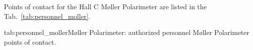 \begin{safetyen}{0}{0}
Points of contact for the Hall C M\o ller Polarimeter are listed in the Tab.~\ref{tab:personnel_moller}.

\begin{namestab}{tab:personnel_moller}{M\o ller Polarimeter: authorized personnel}{%
   M\o ller Polarimeter points of contact.}
\end{namestab}
\end{safetyen}
